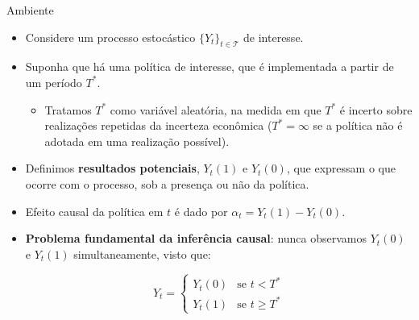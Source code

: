 \documentclass[11pt]{beamer}
\begin{document}
\begin{frame}{Ambiente}
	\begin{itemize}
		\item Considere um processo estocástico $\{Y_t\}_{t \in \mathcal{T}}$ de interesse.
		\item Suponha que há uma política de interesse, que é implementada a partir de um período $T^*$.
		\begin{itemize}
			\item Tratamos $T^*$ como variável aleatória, na medida em que $T^*$ é incerto sobre realizações repetidas da incerteza econômica ($T^* = \infty$ se a política não é adotada em uma realização possível).
		\end{itemize}
		\item Definimos \textbf{resultados potenciais}, $Y_t(1)$ e $Y_t(0)$, que expressam o que ocorre com o processo, sob a presença ou não da política.
		\item Efeito causal da política em $t$ é dado por $\alpha_t = Y_t(1) - Y_t(0)$.
		\item \textbf{Problema fundamental da inferência causal}: nunca observamos $Y_t(0)$ e $Y_t(1)$ simultaneamente, visto que:
		
		
		$$Y_t = \begin{cases}
			Y_t(0) & \text{se } t < T^* \\
			Y_t(1) & \text{se } t \geq T^*
		\end{cases}$$
		
		\end{itemize}
\end{frame}
\end{document}
